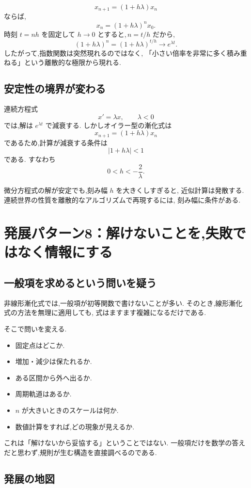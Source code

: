 \[
  x_{n+1}=(1+h\lambda)x_n
\]
ならば,
\[
  x_n=(1+h\lambda)^n x_0.
\]
時刻 $t=nh$ を固定して $h\to0$ とすると,\,$n=t/h$ だから,
\[
  (1+h\lambda)^n
  =\left(1+h\lambda\right)^{t/h}
  \longrightarrow e^{\lambda t}.
\]
したがって,指数関数は突然現れるのではなく,
「小さい倍率を非常に多く積み重ねる」という離散的な極限から現れる.

\subsection{安定性の境界が変わる}

連続方程式
\[
  x'=\lambda x,\qquad \lambda<0
\]
では,解は $e^{\lambda t}$ で減衰する.
しかしオイラー型の漸化式は
\[
  x_{n+1}=(1+h\lambda)x_n
\]
であるため,計算が減衰する条件は
\[
  |1+h\lambda|<1
\]
である.
すなわち
\[
  0<h<-\frac2\lambda.
\]

微分方程式の解が安定でも,刻み幅 $h$ を大きくしすぎると,
近似計算は発散する.
連続世界の性質を離散的なアルゴリズムで再現するには,
刻み幅に条件がある.

\section{発展パターン8：解けないことを,失敗ではなく情報にする}

\subsection{一般項を求めるという問いを疑う}

非線形漸化式では,一般項が初等関数で書けないことが多い.
そのとき,線形漸化式の方法を無理に適用しても,
式はますます複雑になるだけである.

そこで問いを変える.

\begin{itemize}
  \item 固定点はどこか.
  \item 増加・減少は保たれるか.
  \item ある区間から外へ出るか.
  \item 周期軌道はあるか.
  \item $n$ が大きいときのスケールは何か.
  \item 数値計算をすれば,どの現象が見えるか.
\end{itemize}

これは「解けないから妥協する」ということではない.
一般項だけを数学の答えだと思わず,規則が生む構造を直接調べるのである.

\subsection{発展の地図}

